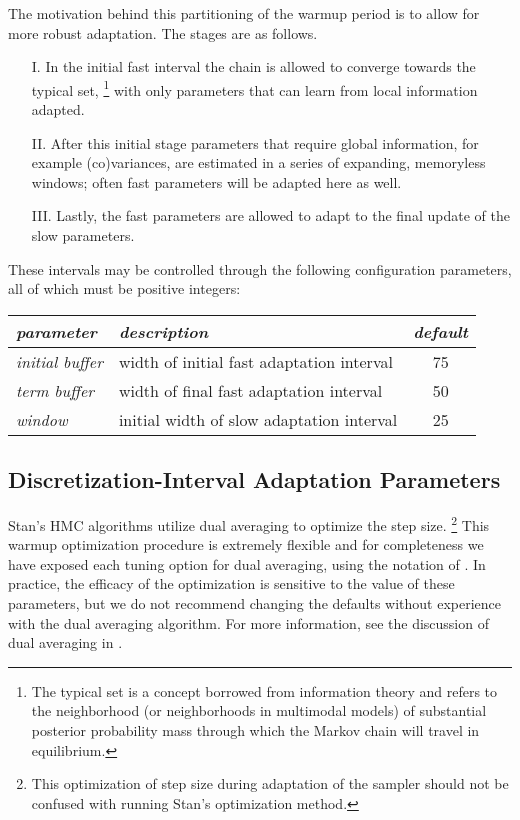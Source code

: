 The motivation behind this partitioning of the warmup period is to
allow for more robust adaptation.  The stages are as follows.

\begin{enumerate}
\item[I.]
In the initial fast interval the chain is allowed to converge
towards the typical set,%
%
\footnote{The typical set is a concept borrowed from information
  theory and refers to the neighborhood (or neighborhoods in
  multimodal models) of substantial posterior probability mass through
  which the Markov chain will travel in equilibrium.}
%
with only parameters that can learn from local information adapted.
\item[II.]
After this initial stage parameters that require global
information, for example (co)variances, are estimated in a series of
expanding, memoryless windows; often fast parameters will be adapted
here as well. 
\item[III.]
Lastly, the fast parameters are allowed to adapt to the
final update of the slow parameters.
\end{enumerate}

These intervals may be controlled through the following
configuration parameters, all of which must be positive integers:
%
\begin{center}
\begin{tabular}{l|lc}
{\it parameter} & {\it description} & {\it default} 
\\ \hline
{\it initial buffer} & width of initial fast adaptation interval
                     & 75
\\
{\it term buffer} & width of final fast adaptation interval
                  &  50
\\
{\it window}  & initial width of slow adaptation interval
              & 25
\end{tabular}
\end{center}

\subsection{Discretization-Interval Adaptation Parameters}

Stan's HMC algorithms utilize dual averaging \citep{Nesterov:2009} to
optimize the step size.%
%
\footnote{This optimization of step size during
adaptation of the sampler should not be confused with running Stan's
optimization method.}
%
This warmup optimization procedure is extremely flexible and for
completeness we have exposed each tuning option for dual averaging,
using the notation of \cite{Hoffman-Gelman:2014}. In practice, the
efficacy of the optimization is sensitive to the value of these
parameters, but we do not recommend changing the defaults without
experience with the dual averaging algorithm. For more information,
see the discussion of dual averaging in \citep{Hoffman-Gelman:2011,
 Hoffman-Gelman:2014}.

